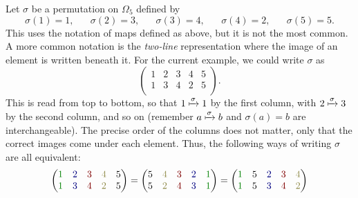 \begin{example}
    Let $\sigma$ be a permutation on $\Omega_{5}$ defined by
    \[
    \sigma(1) = 1, \hspace{20pt} \sigma(2) = 3, \hspace{20pt} \sigma(3) = 4, \hspace{20pt} \sigma(4) = 2, \hspace{20pt} \sigma(5) = 5.
    \]
    This uses the notation of maps defined as above, but it is not the most common. A more common notation is the \textit{two-line} representation where the image of an element is written beneath it. For the current example, we could write $\sigma$ as
    \[
    \begin{pmatrix}
        1 & 2 & 3 & 4 & 5 \\
        1 & 3 & 4 & 2 & 5 \\
    \end{pmatrix}.
    \]
    This is read from top to bottom, so that $1 \xmapsto{\sigma} 1$ by the first column, with $2 \xmapsto{\sigma} 3$ by the second column, and so on (remember $a \xmapsto{\sigma} b$ and $\sigma(a) = b$ are interchangeable). The precise order of the columns does not matter, only that the correct images come under each element. Thus, the following ways of writing $\sigma$ are all equivalent:
    \[
    \begin{pmatrix}
        \textcolor{green!50!black}{1} & \textcolor{blue!50!black}{2} & \textcolor{red!50!black}{3} & \textcolor{yellow!50!black}{4} & 5 \\
        \textcolor{green!50!black}{1} & \textcolor{blue!50!black}{3} & \textcolor{red!50!black}{4} & \textcolor{yellow!50!black}{2} & 5 \\
    \end{pmatrix} = \begin{pmatrix}
        5 & \textcolor{yellow!50!black}{4} & \textcolor{red!50!black}{3} & \textcolor{blue!50!black}{2} & \textcolor{green!50!black}{1} \\
        5 & \textcolor{yellow!50!black}{2} & \textcolor{red!50!black}{4} & \textcolor{blue!50!black}{3} & \textcolor{green!50!black}{1} \\
    \end{pmatrix} = \begin{pmatrix}
        \textcolor{green!50!black}{1} & 5 & \textcolor{blue!50!black}{2} & \textcolor{red!50!black}{3} & \textcolor{yellow!50!black}{4} \\
        \textcolor{green!50!black}{1} & 5 & \textcolor{blue!50!black}{3} & \textcolor{red!50!black}{4} & \textcolor{yellow!50!black}{2} \\

\end{pmatrix}\]
\end{example}
